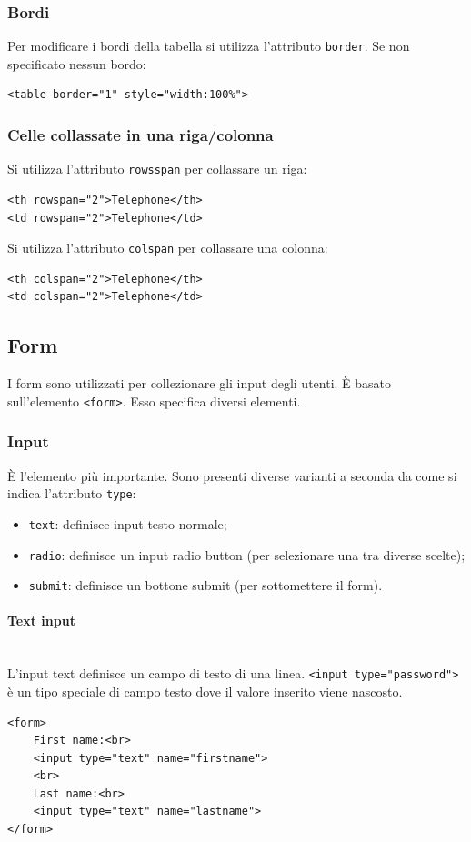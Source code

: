 \documentclass{article}
\begin{document}
\subsubsection{Bordi}
Per modificare i bordi della tabella si utilizza l'attributo \texttt{border}. Se non specificato nessun bordo:
\begin{lstlisting}[style=htmlstyle]
<table border="1" style="width:100%">
\end{lstlisting}
\subsubsection{Celle collassate in una riga/colonna}
Si utilizza l'attributo \texttt{rowsspan} per collassare un riga:
\begin{lstlisting}[style=htmlstyle]
<th rowspan="2">Telephone</th>
<td rowspan="2">Telephone</td>
\end{lstlisting}
Si utilizza l'attributo \texttt{colspan} per collassare una colonna:
\begin{lstlisting}[style=htmlstyle]
<th colspan="2">Telephone</th>
<td colspan="2">Telephone</td>
\end{lstlisting}
\pagebreak
\subsection{Form}
I form sono utilizzati per collezionare gli input degli utenti. È basato sull'elemento \texttt{<form>}. Esso specifica diversi elementi.
\subsubsection{Input}
È l'elemento più importante. Sono presenti diverse varianti a seconda da come si indica l'attributo \texttt{type}:
\begin{itemize}
    \item \texttt{text}: definisce input testo normale;
    \item \texttt{radio}: definisce un input radio button (per selezionare una tra diverse scelte);
    \item \texttt{submit}: definisce un bottone submit (per sottomettere il form).
\end{itemize}
\paragraph{Text input} \mbox{}\\
L'input text definisce un campo di testo di una linea. \texttt{<input type="password">} è un tipo speciale di campo testo dove il valore inserito viene nascosto.
\begin{lstlisting}[style=htmlstyle]
<form>
    First name:<br>
    <input type="text" name="firstname">
    <br>
    Last name:<br>
    <input type="text" name="lastname">
</form>
\end{lstlisting}
\end{document}

